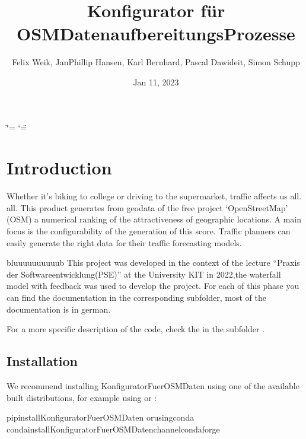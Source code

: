 \documentclass[letterpaper,10pt,english]{sphinxmanual}
\title{Konfigurator für OSM\sphinxhyphen{}Datenaufbereitungs\sphinxhyphen{}Prozesse}
\date{Jan 11, 2023}
\author{Felix Weik, Jan\sphinxhyphen{}Phillip Hansen, Karl Bernhard, Pascal Dawideit, Simon Schupp}
\begin{document}
\ifdefined\shorthandoff
  \ifnum\catcode`\=\string=\active\shorthandoff{=}\fi
  \ifnum\catcode`\"=\active{}\fi
\fi

\pagestyle{empty}
\sphinxmaketitle
\pagestyle{plain}
\sphinxtableofcontents
\pagestyle{normal}
\label{\detokenize{index::doc}}



\chapter{Introduction}
\label{\detokenize{index:konfiguratorfuerosmdaten}}

\sphinxAtStartPar
Whether it’s biking to college or driving to the supermarket, traffic
affects us all. all. This product generates from geodata of the free
project ‘OpenStreetMap’ (OSM) a numerical ranking of the
attractiveness of geographic locations. A main focus is the
configurability of the generation of this score. Traffic planners can
easily generate the right data for their traffic forecasting models.

\sphinxAtStartPar
{} 

\sphinxAtStartPar
bluuuuuuuuuub
This project was developed in the context of the lecture “Praxis der
Softwareentwicklung(PSE)” at the University KIT in 2022,the waterfall
model with feedback was used to develop the project.
For each of this phase you can find the documentation in the
corresponding subfolder, most of the documentation is in german.

\sphinxAtStartPar
For a more specific description of the code, check the  in
the subfolder .


\section{Installation}
\label{\detokenize{index:installation}}
\sphinxAtStartPar
We recommend installing KonfiguratorFuerOSMDaten
using one of the available built distributions,
for example using  or :

\begin{sphinxVerbatim}[commandchars=\\\{\}]
pipinstallKonfiguratorFuerOSMDaten
orusingconda
condainstallKonfiguratorFuerOSMDaten\PYGZhy{}\PYGZhy{}channelconda\PYGZhy{}forge
\end{sphinxVerbatim}
\end{document}
